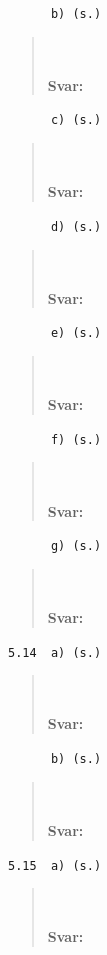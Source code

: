\documentclass[a4paper]{article}
\newcommand{\tskcol}[1]{\textcolor{tskcol}{#1}}
\begin{document}
	\texttt{\tskcol{~~~~~~b) (s.)}}
	\begin{quotation}
		\noindent
		\\ \\
		\textbf{Svar:}
	\end{quotation}
	
	\texttt{\tskcol{~~~~~~c) (s.)}}
	\begin{quotation}
		\noindent
		\\ \\
		\textbf{Svar:}
	\end{quotation}
	
	\texttt{\tskcol{~~~~~~d) (s.)}}
	\begin{quotation}
		\noindent
		\\ \\
		\textbf{Svar:}
	\end{quotation}
	
	\texttt{\tskcol{~~~~~~e) (s.)}}
	\begin{quotation}
		\noindent
		\\ \\
		\textbf{Svar:}
	\end{quotation}
	
	\texttt{\tskcol{~~~~~~f) (s.)}}
	\begin{quotation}
		\noindent
		\\ \\
		\textbf{Svar:}
	\end{quotation}
	
	\texttt{\tskcol{~~~~~~g) (s.)}}
	\begin{quotation}
		\noindent
		\\ \\
		\textbf{Svar:}
	\end{quotation}
	
	\texttt{\tskcol{5.14~~a) (s.)}}
	\begin{quotation}
		\noindent
		\\ \\
		\textbf{Svar:}
	\end{quotation}
	
	\texttt{\tskcol{~~~~~~b) (s.)}}
	\begin{quotation}
		\noindent
		\\ \\
		\textbf{Svar:}
	\end{quotation}
	
	\texttt{\tskcol{5.15~~a) (s.)}}
	\begin{quotation}
		\noindent
		\\ \\
		\textbf{Svar:}
	\end{quotation}
	
\end{document}
